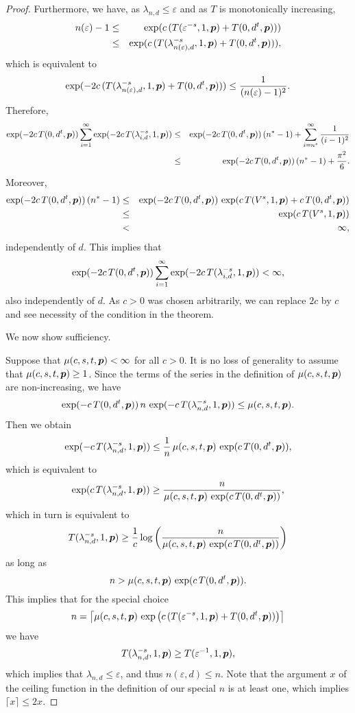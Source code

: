 \documentclass[11pt,a4paper]{article}
\begin{document}
{\begin{proof}
Furthermore, we have, as $\lambda_{n,d}\le \varepsilon$ and as $T$ is monotonically increasing, 
\begin{eqnarray*}
n(\varepsilon)-1 & \le & \exp(c\, (T(\varepsilon^{-s},1,\boldsymbol{p}) + T(0,d^t,\boldsymbol{p})))\\
& \le & \exp(c\, (T(\lambda_{n(\varepsilon),d}^{-s},1,\boldsymbol{p}) + T(0,d^t,\boldsymbol{p}))),
\end{eqnarray*}
which is equivalent to 
\[
\exp(-2c\, (T(\lambda_{n(\varepsilon),d}^{-s},1,\boldsymbol{p}) + T(0,d^t,\boldsymbol{p}))) \le \frac{1}{(n(\varepsilon)-1)^2}.
\]
Therefore,
\begin{eqnarray*}
    \exp(-2c\, T(0,d^t,\boldsymbol{p})) \sum_{i=1}^\infty \exp(-2c\, T(\lambda_{i,d}^{-s},1,\boldsymbol{p}))
    &\le& \exp(-2c\, T(0,d^t,\boldsymbol{p}))\, (n^*-1) + \sum_{i=n^*}^\infty \frac{1}{(i-1)^2}\\
    &\le& \exp(-2c\, T(0,d^t,\boldsymbol{p}))\, (n^*-1) + \frac{\pi^2}{6}.
\end{eqnarray*}
Moreover,
\begin{eqnarray*}
    \exp(-2c\, T(0,d^t,\boldsymbol{p}))\, (n^*-1) &\le & \exp(-2c\, T(0,d^t,\boldsymbol{p}))\, 
    \exp (c\, T(V^s,1,\boldsymbol{p}) + c\, T(0,d^t,\boldsymbol{p}))\\
    &\le & \exp (c\, T(V^s,1,\boldsymbol{p}))\\
    &<& \infty,
\end{eqnarray*}
independently of $d$. This implies that 
\[
\exp(-2c\, T(0,d^t,\boldsymbol{p})) \sum_{i=1}^\infty \exp(-2c\, T(\lambda_{i,d}^{-s},1,\boldsymbol{p}))<\infty,
\]
also independently of $d$. As $c>0$ was chosen arbitrarily, we can replace $2c$ by $c$ and see
necessity of the condition in the theorem. 

\medskip

We now show sufficiency.

Suppose that $\mu(c,s,t,\boldsymbol{p}) <\infty$ for all $c>0$. It is no loss of generality to assume that 
$\mu(c,s,t,\boldsymbol{p}) \ge 1$. Since the terms of the series in the definition of $\mu(c,s,t,\boldsymbol{p}) $ are non-increasing, we have 
\[
\exp (-c\, T(0,d^t,\boldsymbol{p}))\, n\, \exp (-c\, T(\lambda_{n,d}^{-s},1,\boldsymbol{p})) \le \mu (c,s,t,\boldsymbol{p}).
\]
Then we obtain 
\[
\exp (-c\, T(\lambda_{n,d}^{-s},1,\boldsymbol{p})) \le \frac{1}{n}\, \mu (c,s,t,\boldsymbol{p})\, 
\exp (c\, T(0,d^t,\boldsymbol{p})),
\]
which is equivalent to 
\[
\exp (c\, T(\lambda_{n,d}^{-s},1,\boldsymbol{p})) \ge \frac{n}{\mu (c,s,t,\boldsymbol{p})\, 
\exp (c\, T(0,d^t,\boldsymbol{p}))},
\]
which in turn is equivalent to 
\[
T(\lambda_{n,d}^{-s},1,\boldsymbol{p}) \ge \frac{1}{c}\log \left(\frac{n}{\mu (c,s,t,\boldsymbol{p})\, 
\exp (c\, T(0,d^t,\boldsymbol{p}))}\right)
\]
as long as 
\[
n> \mu (c,s,t,\boldsymbol{p})\, \exp (c\, T(0,d^t,\boldsymbol{p})).
\]
This implies that for the special choice 
\[
n= \left\lceil 
   \mu (c,s,t,\boldsymbol{p})\, \exp \left(c\, (T(\varepsilon^{-s},1,\boldsymbol{p}) + T(0,d^t,\boldsymbol{p}))\right)
   \right\rceil 
\]
we have
\[
T(\lambda_{n,d}^{-s},1,\boldsymbol{p}) \ge T(\varepsilon^{-1},1,\boldsymbol{p}),
\]
which implies that $\lambda_{n,d} \le \varepsilon$, and thus $n(\varepsilon,d)\le n$. Note that the 
argument $x$ of the ceiling function in the definition of our special $n$ is at least one, which implies 
$\lceil x \rceil \le 2x$.


\end{proof}}
\end{document}
